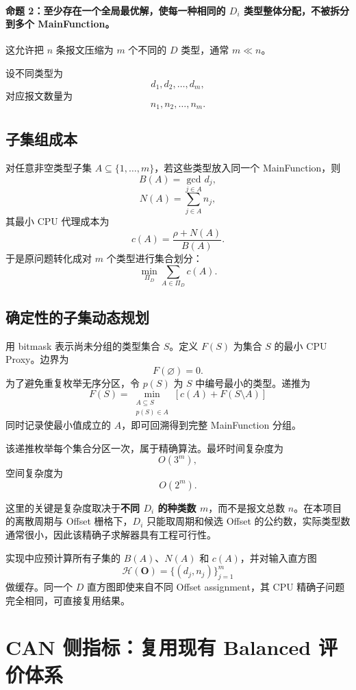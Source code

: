 \documentclass[11pt,a4paper,fontset=none]{ctexart}
\begin{document}
\paragraph{命题 2：至少存在一个全局最优解，使每一种相同的 $D_i$ 类型整体分配，不被拆分到多个 MainFunction。}

这允许把 $n$ 条报文压缩为 $m$ 个不同的 $D$ 类型，通常 $m\ll n$。

设不同类型为
\[
d_1,d_2,\ldots,d_m,
\]
对应报文数量为
\[
n_1,n_2,\ldots,n_m.
\]

\subsection{子集组成本}

对任意非空类型子集 $A\subseteq\{1,\ldots,m\}$，若这些类型放入同一个 MainFunction，则
\[
B(A)=\gcd_{j\in A}d_j,
\tag{21}
\]
\[
N(A)=\sum_{j\in A}n_j,
\tag{22}
\]
其最小 CPU 代理成本为
\[
c(A)=\frac{\rho+N(A)}{B(A)}.
\tag{23}
\]
于是原问题转化成对 $m$ 个类型进行集合划分：
\[
\min_{\Pi_D}
\sum_{A\in\Pi_D}c(A).
\tag{24}
\]

\subsection{确定性的子集动态规划}

用 bitmask 表示尚未分组的类型集合 $S$。定义 $F(S)$ 为集合 $S$ 的最小 CPU Proxy。边界为
\[
F(\varnothing)=0.
\tag{25}
\]
为了避免重复枚举无序分区，令 $p(S)$ 为 $S$ 中编号最小的类型。递推为
\[
\boxed{
F(S)=
\min_{\substack{A\subseteq S\\p(S)\in A}}
\left[c(A)+F(S\setminus A)\right]
}
\tag{26}
\]
同时记录使最小值成立的 $A$，即可回溯得到完整 MainFunction 分组。

该递推枚举每个集合分区一次，属于精确算法。最坏时间复杂度为
\[
O(3^m),
\tag{27}
\]
空间复杂度为
\[
O(2^m).
\tag{28}
\]

这里的关键是复杂度取决于\textbf{不同 $D_i$ 的种类数 $m$}，而不是报文总数 $n$。在本项目的离散周期与 Offset 栅格下，$D_i$ 只能取周期和候选 Offset 的公约数，实际类型数通常很小，因此该精确子求解器具有工程可行性。

实现中应预计算所有子集的 $B(A)$、$N(A)$ 和 $c(A)$，并对输入直方图
\[
\mathcal H(\mathbf O)=\{(d_j,n_j)\}_{j=1}^{m}
\tag{29}
\]
做缓存。同一个 $D$ 直方图即使来自不同 Offset assignment，其 CPU 精确子问题完全相同，可直接复用结果。

\section{CAN 侧指标：复用现有 Balanced 评价体系}
\end{document}
